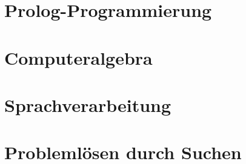 \documentclass{scrreprt}
\begin{document}
\chapter{Prolog-Programmierung}


\chapter{Computeralgebra}


\chapter{Sprachverarbeitung}


\chapter{Problemlösen durch Suchen}


\end{document}
